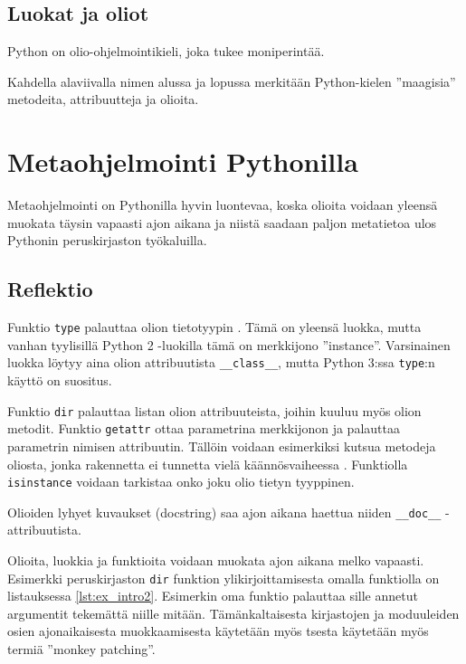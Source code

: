\documentclass[finnish]{tktltiki2}
\theoremstyle{definition}
\theoremstyle{remark}
\begin{document}
\subsection{Luokat ja oliot}


Python on olio-ohjelmointikieli, joka tukee moniperintää.

Kahdella alaviivalla nimen alussa ja lopussa merkitään Python-kielen ''maagisia'' metodeita, attribuutteja ja olioita.





\section{Metaohjelmointi Pythonilla}

Metaohjelmointi on Pythonilla hyvin luontevaa, koska olioita voidaan yleensä muokata täysin vapaasti ajon aikana ja niistä saadaan paljon metatietoa ulos Pythonin peruskirjaston työkaluilla.

 
\subsection{Reflektio}

Funktio \verb|type| palauttaa olion tietotyypin \cite{dive-into-python}. Tämä on yleensä luokka, mutta vanhan tyylisillä Python 2 -luokilla tämä on merkkijono ''instance''. Varsinainen luokka löytyy aina olion attribuutista \verb|__class__|, mutta Python 3:ssa \verb|type|:n käyttö on suositus.

Funktio \verb|dir| palauttaa listan olion attribuuteista, joihin kuuluu myös olion metodit. Funktio \verb|getattr| ottaa parametrina merkkijonon ja palauttaa parametrin nimisen attribuutin. Tällöin voidaan esimerkiksi kutsua metodeja oliosta, jonka rakennetta ei tunnetta vielä käännösvaiheessa \cite{dive-into-python}. Funktiolla \verb|isinstance| voidaan tarkistaa onko joku olio tietyn tyyppinen. 

Olioiden lyhyet kuvaukset (docstring) saa ajon aikana haettua niiden \verb|__doc__| -attribuutista. 

Olioita, luokkia ja funktioita voidaan muokata ajon aikana melko vapaasti. Esimerkki peruskirjaston \verb|dir| funktion ylikirjoittamisesta omalla funktiolla on listauksessa \ref{lst:ex_intro2}. Esimerkin oma funktio palauttaa sille annetut argumentit tekemättä niille mitään. Tämänkaltaisesta kirjastojen ja moduuleiden osien ajonaikaisesta muokkaamisesta käytetään myös tsesta käytetään myös termiä ''monkey patching''.
\end{document}
